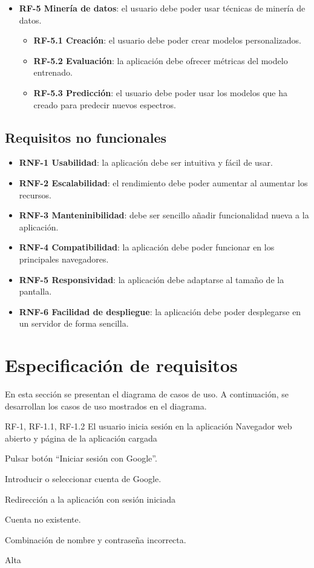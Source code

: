 \begin{itemize}
\begin{itemize}
	\end{itemize}
	\item \textbf{RF-5 Minería de datos}: el usuario debe poder usar técnicas 
	de minería de datos.
	\begin{itemize}
		\item \textbf{RF-5.1 Creación}: el usuario debe poder crear modelos 
		personalizados.
		\item \textbf{RF-5.2 Evaluación}: la aplicación debe ofrecer métricas 
		del modelo entrenado.
		\item \textbf{RF-5.3 Predicción}: el usuario debe poder usar los 
		modelos que ha creado para predecir nuevos espectros.
	\end{itemize}
\end{itemize}

\subsection{Requisitos no funcionales}

	\begin{itemize}
	\item \textbf{RNF-1 Usabilidad}: la aplicación debe ser intuitiva y fácil 
	de usar.
	\item \textbf{RNF-2 Escalabilidad}: el rendimiento debe poder aumentar al 
	aumentar los recursos.
	\item \textbf{RNF-3 Manteninibilidad}: debe ser sencillo añadir 
	funcionalidad nueva a la aplicación.
	\item \textbf{RNF-4 Compatibilidad}: la aplicación debe poder funcionar en 
	los principales navegadores.
	\item \textbf{RNF-5 Responsividad}: la aplicación debe adaptarse al tamaño 
	de la pantalla.
	\item \textbf{RNF-6 Facilidad de despliegue}: la aplicación debe poder 
	desplegarse en un servidor de forma sencilla.
	\end{itemize}

\section{Especificación de requisitos}

En esta sección se presentan el diagrama de casos de uso. A continuación, se 
desarrollan los casos de uso mostrados en el diagrama.


{RF-1, RF-1.1, RF-1.2}
{El usuario inicia sesión en la aplicación}
{Navegador web abierto y página de la aplicación cargada}
{
	\item Pulsar botón ``Iniciar sesión con Google''.
	\item Introducir o seleccionar cuenta de Google.
}
{Redirección a la aplicación con sesión iniciada}
{	\item Cuenta no existente.
	\item Combinación de nombre y contraseña incorrecta.
}
{Alta}

